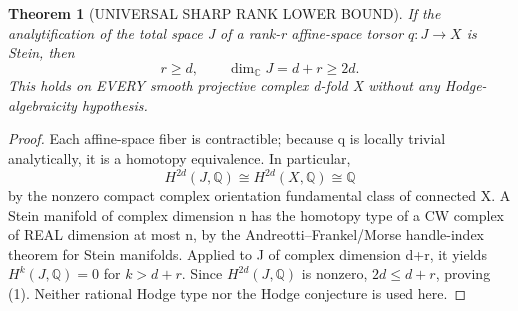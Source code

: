 \documentclass[11pt]{article}
\newtheorem{theorem}{Theorem}
\begin{document}
\begin{theorem}[UNIVERSAL SHARP RANK LOWER BOUND]
If the analytification of the total space J
of a rank-r affine-space torsor
$q:J\to X$ is Stein, then
\[
 \boxed{r\ge d,\qquad
        \dim_\mathbb C J=d+r\ge2d.}                  \tag{1}
\]
This holds on EVERY smooth projective
complex d-fold X without any
Hodge-algebraicity hypothesis.
\end{theorem}
\begin{proof}
Each affine-space fiber is contractible;
because q is locally trivial analytically,
it is a homotopy equivalence. In particular,
\[
 H^{2d}(J,\mathbb Q)\cong H^{2d}(X,\mathbb Q)
              \cong\mathbb Q
\]
by the nonzero compact complex orientation
fundamental class of connected X.
A Stein manifold of complex dimension n
has the homotopy type of a CW complex
of REAL dimension at most n,
by the Andreotti--Frankel/Morse
handle-index theorem for Stein manifolds.
Applied to J of complex dimension d+r,
it yields $H^k(J,\mathbb Q)=0$ for
$k>d+r$. Since $H^{2d}(J,\mathbb Q)$
is nonzero, $2d\le d+r$, proving (1).
Neither rational Hodge type nor the
Hodge conjecture is used here.
\end{proof}
\end{document}
